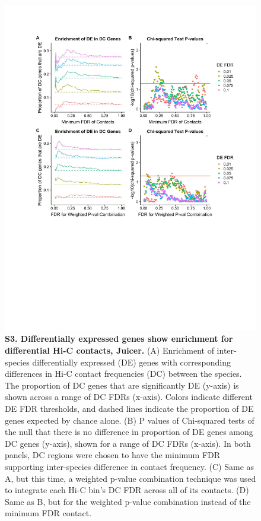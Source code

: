 \begin{figure}[!htb]
\centering
\includegraphics[width=6in]{img/figS3.pdf}
\caption[Differentially expressed genes show enrichment for differential Hi-C contacts, Juicer.]{\textbf{S3. Differentially expressed genes show enrichment for differential Hi-C contacts, Juicer.} (A) Enrichment of inter-species differentially expressed (DE) genes with corresponding differences in Hi-C contact frequencies (DC) between the species. The proportion of DC genes that are significantly DE (y-axis) is shown across a range of DC FDRs (x-axis). Colors indicate different DE FDR thresholds, and dashed lines indicate the proportion of DE genes expected by chance alone. (B) P values of Chi-squared tests of the null that there is no difference in proportion of DE genes among DC genes (y-axis), shown for a range of DC FDRs (x-axis). In both panels, DC regions were chosen to have the minimum FDR supporting inter-species difference in contact frequency. (C) Same as A, but this time, a weighted p-value combination technique \cite{Whitlock.2005} was used to integrate each Hi-C bin's DC FDR across all of its contacts. (D) Same as B, but for the weighted p-value combination instead of the minimum FDR contact.}
\label{fig:figS3}
\end{figure}

